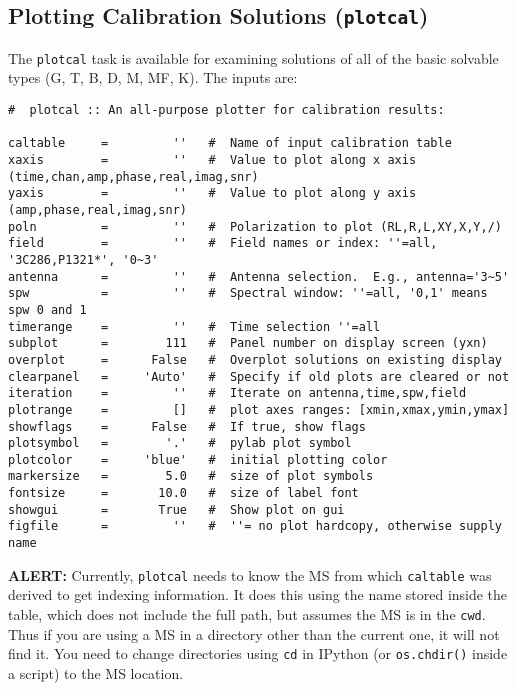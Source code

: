 \subsection{Plotting Calibration Solutions ({\tt plotcal})}
\label{section:cal.tables.plotcal}

The {\tt plotcal} task is available for examining solutions of all of
the basic solvable types (G, T, B, D, M, MF, K).  The inputs are:
\small
\begin{verbatim}
#  plotcal :: An all-purpose plotter for calibration results:

caltable     =         ''   #  Name of input calibration table
xaxis        =         ''   #  Value to plot along x axis (time,chan,amp,phase,real,imag,snr)
yaxis        =         ''   #  Value to plot along y axis (amp,phase,real,imag,snr)
poln         =         ''   #  Polarization to plot (RL,R,L,XY,X,Y,/)
field        =         ''   #  Field names or index: ''=all, '3C286,P1321*', '0~3'
antenna      =         ''   #  Antenna selection.  E.g., antenna='3~5'
spw          =         ''   #  Spectral window: ''=all, '0,1' means spw 0 and 1
timerange    =         ''   #  Time selection ''=all
subplot      =        111   #  Panel number on display screen (yxn)
overplot     =      False   #  Overplot solutions on existing display
clearpanel   =     'Auto'   #  Specify if old plots are cleared or not
iteration    =         ''   #  Iterate on antenna,time,spw,field
plotrange    =         []   #  plot axes ranges: [xmin,xmax,ymin,ymax]
showflags    =      False   #  If true, show flags
plotsymbol   =        '.'   #  pylab plot symbol
plotcolor    =     'blue'   #  initial plotting color
markersize   =        5.0   #  size of plot symbols
fontsize     =       10.0   #  size of label font
showgui      =       True   #  Show plot on gui
figfile      =         ''   #  ''= no plot hardcopy, otherwise supply name
\end{verbatim}
\normalsize

{\bf ALERT:} Currently, {\tt plotcal} needs to know the MS from
which {\tt caltable} was derived to get indexing information.  It does
this using the name stored inside the table, which does not include
the full path, but assumes the MS is in the {\tt cwd}.  Thus if you
are using a MS in a directory other than the current one, it will not
find it.  You need to change directories using {\tt cd} in
IPython (or {\tt os.chdir()} inside a script) to the MS location.

